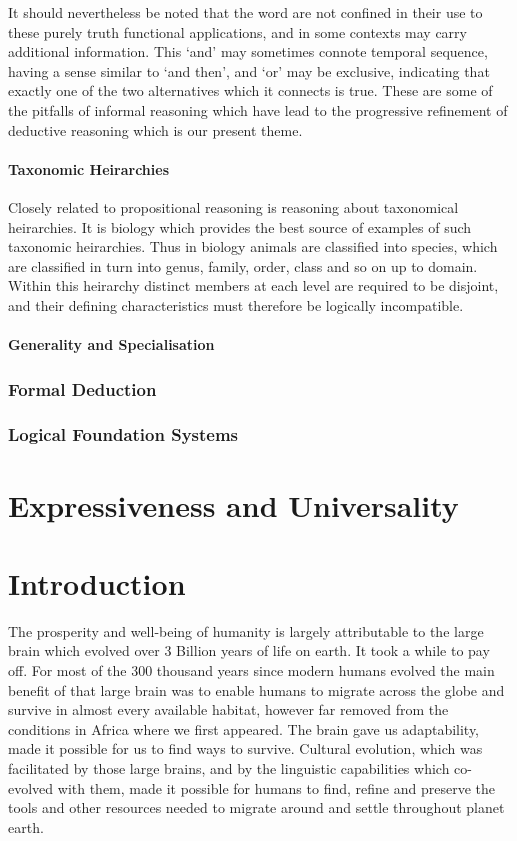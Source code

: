 \documentclass[10pt,titlepage]{book}
\begin{document}
It should nevertheless be noted that the word are not confined in their use to these purely truth functional applications, and in some contexts may carry additional information.
This `and' may sometimes connote temporal sequence, having a sense similar to `and then', and `or' may be exclusive, indicating that exactly one of the two alternatives which it connects is true.
These are some of the pitfalls of informal reasoning which have lead to the progressive refinement of deductive reasoning which is our present theme.

\subsubsection{Taxonomic Heirarchies}

Closely related to propositional reasoning is reasoning about taxonomical heirarchies.
It is biology which provides the best source of examples of such taxonomic heirarchies.
Thus in biology animals are classified into species, which are classified in turn into genus, family, order, class and so on up to domain.
Within this heirarchy distinct members at each level are required to be disjoint, and their defining characteristics must therefore be logically incompatible.

\subsubsection{Generality and Specialisation}

\subsection{Formal Deduction}

\subsection{Logical Foundation Systems}

\chapter{Expressiveness and Universality}

\chapter{Introduction}

The prosperity and well-being of humanity is largely attributable to the large brain which evolved over 3 Billion years of life on earth.
It took a while to pay off.
For most of the 300 thousand years since modern humans evolved the main benefit of that large brain was to enable humans to migrate across the globe and survive in almost every available habitat, however far removed from the conditions in Africa where we first appeared.
The brain gave us adaptability, made it possible for us to find ways to survive.
Cultural evolution, which was facilitated by those large brains, and by the linguistic capabilities which co-evolved with them, made it possible for humans to find, refine and preserve the tools and other resources needed to migrate around and settle throughout planet earth.
\end{document}

